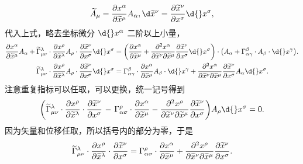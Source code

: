 \documentclass[UTF8, 12pt, a4paper, oneside, onecolumn, fontset=none]{ctexart}
\begin{document}
\begin{equation}
\widetilde{A}_{\mu}=\frac{\partial{}x^{\alpha}}{\partial\widetilde{x}^{\mu}}A_{\alpha},\d\widetilde{x}^{\nu}=\frac{\partial\widetilde{x}^{\nu}}{\partial{}x^{\sigma}}\d{}x^{\sigma},
\end{equation}
代入上式，略去坐标微分 $\d{}x^{\alpha}$ 二阶以上小量，
\begin{align}
\frac{\partial{}x^{\alpha}}{\partial\widetilde{x}^{\mu}}A_{\alpha}+\widetilde{\Gamma}_{\mu\nu}^{\lambda}\cdot\frac{\partial{}x^{\rho}}{\partial\widetilde{x}^{\lambda}}A_{\rho}\cdot\frac{\partial\widetilde{x}^{\nu}}{\partial{}x^{\sigma}}\d{}x^{\sigma}&=\mleft(\frac{\partial{}x^{\alpha}}{\partial\widetilde{x}^{\mu}}+\frac{\partial{}^{2}x^{\alpha}}{\partial\widetilde{x}^{\nu}\partial\widetilde{x}^{\mu}}\frac{\partial\widetilde{x}^{\nu}}{\partial{}x^{\sigma}}\d{}x^{\sigma}\mright)\cdot\mleft(A_{\alpha}+\Gamma_{\alpha\gamma}^{\beta}\cdot A_{\beta}\cdot\d{}x^{\gamma}\mright).\notag\\
\widetilde{\Gamma}_{\mu\nu}^{\lambda}\cdot\frac{\partial{}x^{\rho}}{\partial\widetilde{x}^{\lambda}}A_{\rho}\cdot\frac{\partial\widetilde{x}^{\nu}}{\partial{}x^{\sigma}}\d{}x^{\sigma}&=\Gamma_{\alpha\gamma}^{\beta}\cdot\frac{\partial{}x^{\alpha}}{\partial\widetilde{x}^{\mu}}A_{\beta}\cdot\d{}x^{\gamma}+\frac{\partial{}^{2}x^{\alpha}}{\partial\widetilde{x}^{\nu}\partial\widetilde{x}^{\mu}}\frac{\partial\widetilde{x}^{\nu}}{\partial{}x^{\sigma}}A_{\alpha}\d{}x^{\sigma}.\notag
\end{align}
注意重复指标可以任取，可以更换，统一记号得到
\begin{equation}
\mleft(\widetilde{\Gamma}_{\mu\nu}^{\lambda}\cdot\frac{\partial{}x^{\rho}}{\partial\widetilde{x}^{\lambda}}\cdot\frac{\partial\widetilde{x}^{\nu}}{\partial{}x^{\sigma}}\mright.-\mleft.\Gamma_{\alpha\sigma}^{\rho}\cdot\frac{\partial{}x^{\alpha}}{\partial\widetilde{x}^{\mu}}-\frac{\partial{}^{2}x^{\rho}}{\partial\widetilde{x}^{\nu}\partial\widetilde{x}^{\mu}}\frac{\partial\widetilde{x}^{\nu}}{\partial{}x^{\sigma}}\mright) A_{\rho}\d{}x^{\sigma}=0.\notag
\end{equation}
因为矢量和位移任取，所以括号内的部分为零，于是
\begin{equation}
\widetilde{\Gamma}_{\mu\nu}^{\lambda}\cdot\frac{\partial{}x^{\rho}}{\partial\widetilde{x}^{\lambda}}\cdot\frac{\partial\widetilde{x}^{\nu}}{\partial{}x^{\sigma}}=\Gamma_{\alpha\sigma}^{\rho}\cdot\frac{\partial{}x^{\alpha}}{\partial\widetilde{x}^{\mu}}+\frac{\partial{}^{2}x^{\rho}}{\partial\widetilde{x}^{\nu}\partial\widetilde{x}^{\mu}}\frac{\partial\widetilde{x}^{\nu}}{\partial{}x^{\sigma}}.\notag
\end{equation}
\end{document}

